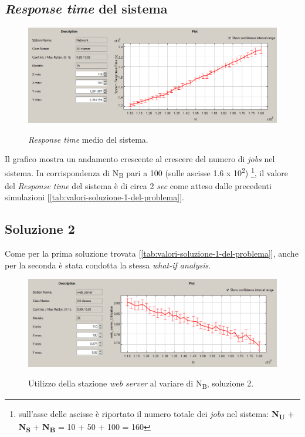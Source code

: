\documentclass[../main.tex]{subfiles}
\begin{document}
    \subsection{\textit{Response time} del sistema}\label{subsec:response-time-del-sistema}
    \begin{figure}[H]
        \centering
        \includegraphics[scale = 0.6]{assets/res_sys_1.PNG}\\
        \caption[\textit{Response time} medio del sistema]{\textit{Response time} medio del sistema.}
        \label{fig:response-time-system}
    \end{figure}
    Il grafico mostra un andamento crescente al crescere del numero di \textit{jobs} nel sistema.
    In corrispondenza di N\textsubscript{B} pari a 100 (sulle ascisse 1.6 x 10\textsuperscript{2}) \footnote{sull'asse delle ascisse è riportato
    il numero totale dei \textit{jobs} nel sistema: \textbf{N\textsubscript{U}} + \textbf{N\textsubscript{S}} +
    \textbf{N\textsubscript{B}} = 10 + 50 + 100 = 160}, il valore del \textit{Response time} del sistema è di circa 2
    \textit{sec} come atteso dalle precedenti simulazioni [\ref{tab:valori-soluzione-1-del-problema}].

    \subsection{Soluzione 2}\label{subsec:soluzione-2}
    Come per la prima soluzione trovata [\ref{tab:valori-soluzione-1-del-problema}], anche per la seconda è stata condotta
    la stessa \textit{what-if analysis}.

    \begin{figure}[H]
        \centering
        \includegraphics[scale = 0.6]{assets/ws_ut_2.PNG}\\
        \caption[\textit{Utilizzo} della stazione \textit{web server}, soluzione 2]{Utilizzo della stazione
        \textit{web server} al variare di N\textsubscript{B}, soluzione 2.}
        \label{fig:utilizzo-2-ws}
    \end{figure}
\end{document}
